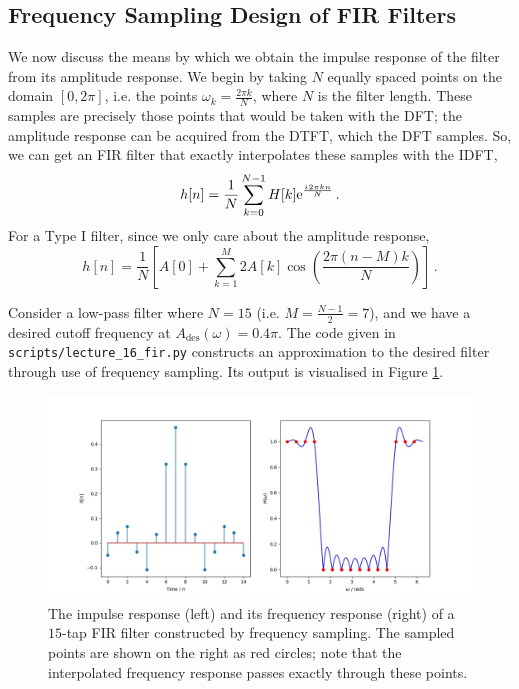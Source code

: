 \subsection{Frequency Sampling Design of FIR Filters}
%
We now discuss the means by which we obtain the impulse response of the filter
from its amplitude response. We begin by taking $N$ equally spaced points on
the domain $[0,2\pi]$, i.e. the points $\omega_k = \frac{2\pi k}{N}$, where $N$
is the filter length. These samples are precisely those points that would be
taken with the DFT; the amplitude response can be acquired from the DTFT, which
the DFT samples. So, we can get an FIR filter that exactly interpolates these
samples with the IDFT,
%
\begin{displaymath}
  h[n] = \frac{1}{N}\sum_{k=0}^{N-1}H[k]\mathrm{e}^{\frac{{i\mkern1mu} 2\pi k n}{N}} \,.
\end{displaymath}
%
For a Type I filter, since we only care about the amplitude response,
%
\begin{displaymath}
  h[n] = \frac{1}{N}\left[
    A[0] + \sum_{k=1}^M 2A[k]\cos\left(\frac{2\pi(n-M)k}{N}\right)
  \right] \,.
\end{displaymath}
%
\begin{exmp}
  Consider a low-pass filter where $N=15$ (i.e. $M = \frac{N-1}{2} = 7$), and we
  have a desired cutoff frequency at $A_\mathrm{des}(\omega) = 0.4\pi$. The
  code given in \texttt{scripts/lecture\_16\_fir.py} constructs an approximation
  to the desired filter through use of frequency sampling. Its output is visualised
  in Figure \ref{fig::lecture_16_fir}.
  \begin{figure}[H]
    \includegraphics[width=\textwidth]{images/lecture_16_fir.JPG}
    \caption{The impulse response (left) and its frequency response
      (right) of a $15$-tap FIR filter constructed by frequency sampling.
      The sampled points are shown on the right as red circles; note that
      the interpolated frequency response passes exactly through these
      points.
    }
    \label{fig::lecture_16_fir}
  \end{figure}
\end{exmp}
